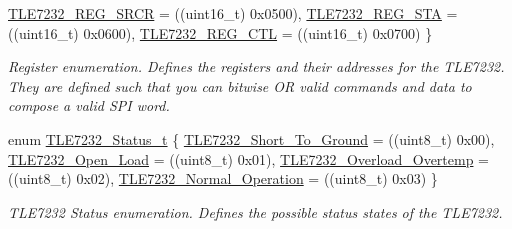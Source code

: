 \begin{DoxyCompactItemize}
\hyperlink{group__tle7232__driver_ggabd1d28f92015db8d6a418c8346f4b4ffabda605c9fd11bb4b3ebec02afc0b3779}{T\-L\-E7232\-\_\-\-R\-E\-G\-\_\-\-S\-R\-C\-R} = ((uint16\-\_\-t) 0x0500), 
\hyperlink{group__tle7232__driver_ggabd1d28f92015db8d6a418c8346f4b4ffa3cfa8fd947bed261da5941282b4ba3c2}{T\-L\-E7232\-\_\-\-R\-E\-G\-\_\-\-S\-T\-A} = ((uint16\-\_\-t) 0x0600), 
\hyperlink{group__tle7232__driver_ggabd1d28f92015db8d6a418c8346f4b4ffa5f2571f5978ed414d188b4d9d045e4c3}{T\-L\-E7232\-\_\-\-R\-E\-G\-\_\-\-C\-T\-L} = ((uint16\-\_\-t) 0x0700)
 \}
\begin{DoxyCompactList}\small\item\em Register enumeration. Defines the registers and their addresses for the T\-L\-E7232. They are defined such that you can bitwise O\-R valid commands and data to compose a valid S\-P\-I word. \end{DoxyCompactList}\item 
enum \hyperlink{group__tle7232__driver_ga84bb3f68b575c6add1c27f053b87746a}{T\-L\-E7232\-\_\-\-Status\-\_\-t} \{ \hyperlink{group__tle7232__driver_gga84bb3f68b575c6add1c27f053b87746aaba0966287a04856e8adc96bf43660a25}{T\-L\-E7232\-\_\-\-Short\-\_\-\-To\-\_\-\-Ground} = ((uint8\-\_\-t) 0x00), 
\hyperlink{group__tle7232__driver_gga84bb3f68b575c6add1c27f053b87746aa7f953b1ba715cf01969f1ee75ac66b5a}{T\-L\-E7232\-\_\-\-Open\-\_\-\-Load} = ((uint8\-\_\-t) 0x01), 
\hyperlink{group__tle7232__driver_gga84bb3f68b575c6add1c27f053b87746aaa205b2791276ee1bf81498e720eb26be}{T\-L\-E7232\-\_\-\-Overload\-\_\-\-Overtemp} = ((uint8\-\_\-t) 0x02), 
\hyperlink{group__tle7232__driver_gga84bb3f68b575c6add1c27f053b87746aa41ad46c089b8040e5c8fe85befa75589}{T\-L\-E7232\-\_\-\-Normal\-\_\-\-Operation} = ((uint8\-\_\-t) 0x03)
 \}
\begin{DoxyCompactList}\small\item\em T\-L\-E7232 Status enumeration. Defines the possible status states of the T\-L\-E7232. \end{DoxyCompactList}\end{DoxyCompactItemize}
